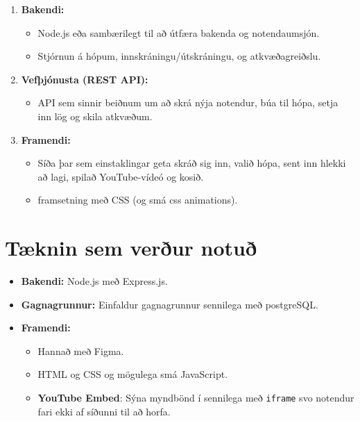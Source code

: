 \documentclass{article}
\begin{document}
\begin{enumerate}[label=\alph*.]
    \item \textbf{Bakendi:}  
        \begin{itemize}
            \item Node.js eða sambærilegt til að útfæra bakenda og notendaumsjón.
            \item Stjórnun á hópum, innskráningu/útskráningu, og atkvæðagreiðslu.
        \end{itemize}
    \item \textbf{Vefþjónusta (REST API):}  
        \begin{itemize}
            \item API sem sinnir beiðnum um að skrá nýja notendur, búa til hópa, setja inn lög og skila atkvæðum.
        \end{itemize}
    \item \textbf{Framendi:}  
        \begin{itemize}
            \item Síða þar sem einstaklingar geta skráð sig inn, valið hópa, sent inn hlekki að lagi, spilað YouTube-vídeó og kosið.
            \item framsetning með CSS (og smá css animations).
        \end{itemize}
\end{enumerate}

\section{Tæknin sem verður notuð}
\begin{itemize}
    \item \textbf{Bakendi:} Node.js með Express.js. 
    \item \textbf{Gagnagrunnur:} Einfaldur gagnagrunnur sennilega með postgreSQL. 
    \item \textbf{Framendi:}  
          \begin{itemize}
            \item Hannað með Figma.
            \item HTML og CSS og mögulega smá JavaScript.
            \item \textbf{YouTube Embed}: Sýna myndbönd í sennilega með \texttt{iframe} svo notendur fari ekki af síðunni til að horfa.
          \end{itemize}
\end{itemize}

\end{document}
